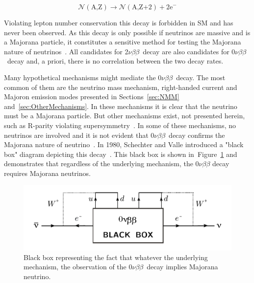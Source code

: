 \documentclass[main.tex]{subfiles}
\begin{document}
\begin{equation}
\mathcal{N} (\text{A,Z}) \rightarrow \mathcal{N} (\text{A,Z+2}) + \text{2e}^- 
\end{equation}


\bigskip


\NI Violating lepton number conservation this decay is forbidden in SM and has never been observed. As this decay is only possible if neutrinos are massive and is a Majorana particle, it constitutes a sensitive method for testing the Majorana nature of neutrinos~\cite{RacahNeutrinolessDBDMajorana}. All candidates for 2$\nu\beta\beta$~decay are also candidates for 0$\nu\beta\beta$~decay and, a priori, there is no correlation between the two decay rates. 


\bigskip



\NI Many hypothetical mechanisms might mediate the 0$\nu\beta\beta$~decay. The most common of them are the neutrino mass mechanism, right-handed current and Majoron emission modes presented in Sections~\ref{sec:NMM} and~\ref{sec:OtherMechanisms}. In these mechanisms it is clear that the neutrino must be a Majorana particle. But other mechanisms exist, not presented herein, such as R-parity violating supersymmetry~\cite{SUSYandDBD}. In some of these mechanisms, no neutrinos are involved and it is not evident that 0$\nu\beta\beta$~decay confirms the Majorana nature of neutrino~\cite{SUSYandDBD}. In 1980, Schechter and Valle introduced a "black box" diagram depicting this decay~\cite{SchechterValle}. This black box is shown in~Figure~\ref{0nubbBlackBox} and demonstrates that regardless of the underlying mechanism, the 0$\nu\beta\beta$ decay requires Majorana neutrinos.  


\smallskip

\begin{figure}[h!]
\begin{center}
\includegraphics[scale=0.9]{pictures/Chap2/0nubbBlackBox.pdf}
\caption{Black box representing the fact that whatever the underlying mechanism, the observation of the 0$\nu\beta\beta$~decay implies Majorana neutrino.}
\label{0nubbBlackBox}
\end{center}
\end{figure}
\end{document}
